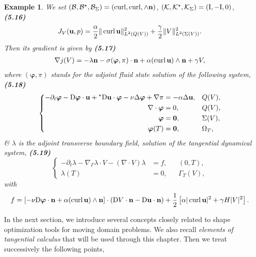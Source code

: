 \documentclass[oneside]{book}
\numberwithin{equation}{section}
\newtheorem{example}{Example}[chapter]
\begin{document}
\begin{example}
	We set $(\mathcal{B},\mathcal{B}^\star,\mathcal{B}_\Sigma) = (\operatorname{curl},\operatorname{curl},\land{\bf n})$, $(\mathcal{K},\mathcal{K}^\star,\mathcal{K}_\Sigma) = ({\rm I},-{\rm I},0)$, \textbf{(5.16)}
	\begin{align*}
		J_V({\bf u},p) = \frac{\alpha}{2}\|\operatorname{curl}{\bf u}\|_{L^2(Q(V))}^2 + \frac{\gamma}{2}\|V\|_{L^2(\Sigma(V))}^2.
	\end{align*}
	Then its gradient is given by \textbf{(5.17)}
	\begin{align*}
		\nabla j(V) = -\lambda{\bf n} - \sigma(\boldsymbol{\varphi},\pi)\cdot{\bf n} + \alpha(\operatorname{curl}{\bf u})\land{\bf n} + \gamma V,
	\end{align*}
	where $(\boldsymbol{\varphi},\pi)$ stands for the adjoint fluid state solution of the following system, \textbf{(5.18)}
	\begin{equation*}
		\left\{\begin{split}
			-\partial_t\boldsymbol{\varphi} - {\rm D}\boldsymbol{\varphi}\cdot{\bf u} + {}^\star{\rm D}{\bf u}\cdot\boldsymbol{\varphi} - \nu\Delta\boldsymbol{\varphi} + \nabla\pi &= -\alpha\Delta{\bf u},&&Q(V),\\
			\nabla\cdot\boldsymbol{\varphi} &= 0,&&Q(V),\\
			\boldsymbol{\varphi} &= {\bf 0},&&\Sigma(V),\\
			\boldsymbol{\varphi}(T) &= {\bf 0},&&\Omega_T,
		\end{split}\right.
	\end{equation*}
	\& $\lambda$ is the adjoint transverse boundary field, solution of the tangential dynamical system, \textbf{(5.19)}
	\begin{equation*}
		\left\{\begin{split}
			-\partial_t\lambda - \nabla_\Gamma\lambda\cdot V - (\nabla\cdot V)\lambda &= f,&&(0,T),\\
			\lambda(T) &= 0,&&\Gamma_T(V),
		\end{split}\right.
	\end{equation*}
	with
	\begin{align*}
		f = [-\nu{\rm D}\boldsymbol{\varphi}\cdot{\bf n} + \alpha(\operatorname{curl}{\bf u})\land{\bf n}]\cdot({\rm D}V\cdot{\bf n} - {\rm D}{\bf u}\cdot{\bf n}) + \frac{1}{2}\left[\alpha|\operatorname{curl}{\bf u}|^2 + \gamma H|V|^2\right].
	\end{align*}
\end{example}
In the next section, we introduce several concepts closely related to shape optimization tools for moving domain problems. We also recall \textit{elements of tangential calculus} that will be used through this chapter. Then we treat successively the following points,
\end{document}
